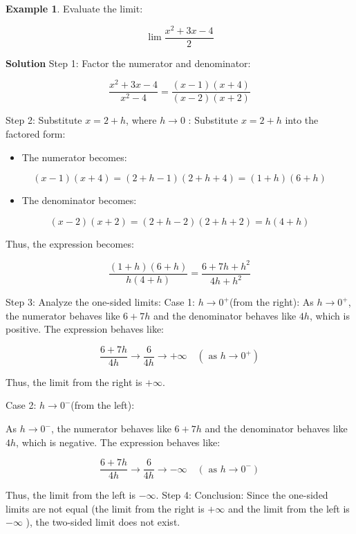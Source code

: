 \documentclass[
]{book}
\providecommand{\tightlist}{%
  \setlength{\itemsep}{0pt}\setlength{\parskip}{0pt}}
\theoremstyle{definition}
\theoremstyle{definition}
\newtheorem{example}{Example}[chapter]
\theoremstyle{definition}
\theoremstyle{definition}
\theoremstyle{remark}
\begin{document}
\begin{example}
\protect\hypertarget{exm:unnamed-chunk-35}{}\label{exm:unnamed-chunk-35}Evaluate the limit:

\[
\lim \frac{x^{2}+3 x-4}{2}
\]
\end{example}

\textbf{Solution}
Step 1: Factor the numerator and denominator:

\[
\frac{x^{2}+3 x-4}{x^{2}-4}=\frac{(x-1)(x+4)}{(x-2)(x+2)}
\]

Step 2: Substitute \(x=2+h\), where \(h \rightarrow 0\) :
Substitute \(x=2+h\) into the factored form:

\begin{itemize}
\tightlist
\item
  The numerator becomes:
\end{itemize}

\[
(x-1)(x+4)=(2+h-1)(2+h+4)=(1+h)(6+h)
\]

\begin{itemize}
\tightlist
\item
  The denominator becomes:
\end{itemize}

\[
(x-2)(x+2)=(2+h-2)(2+h+2)=h(4+h)
\]

Thus, the expression becomes:

\[
\frac{(1+h)(6+h)}{h(4+h)}=\frac{6+7 h+h^{2}}{4 h+h^{2}}
\]

Step 3: Analyze the one-sided limits:
Case 1: \(h \rightarrow 0^{+}\)(from the right):
As \(h \rightarrow 0^{+}\), the numerator behaves like \(6+7 h\) and the denominator behaves like \(4 h\), which is positive. The expression behaves like:

\[
\frac{6+7 h}{4 h} \rightarrow \frac{6}{4 h} \rightarrow+\infty \quad\left(\text { as } h \rightarrow 0^{+}\right)
\]

Thus, the limit from the right is \(+\infty\).

Case 2: \(h \rightarrow 0^{-}\)(from the left):

As \(h \rightarrow 0^{-}\), the numerator behaves like \(6+7 h\) and the denominator behaves like \(4 h\), which is negative. The expression behaves like:

\[
\frac{6+7 h}{4 h} \rightarrow \frac{6}{4 h} \rightarrow-\infty \quad\left(\text { as } h \rightarrow 0^{-}\right)
\]

Thus, the limit from the left is \(-\infty\).
Step 4: Conclusion:
Since the one-sided limits are not equal (the limit from the right is \(+\infty\) and the limit from the left is \(-\infty\) ), the two-sided limit does not exist.
\end{document}
